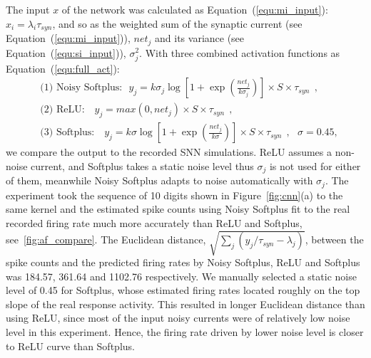 \documentclass[runningheads,a4paper]{llncs}
\begin{document}
The input $x$ of the network was calculated as Equation~(\ref{equ:mi_input}): $x_i=\lambda_i\tau_{syn}$, and so as the weighted sum of the synaptic current (see Equation~(\ref{equ:mi_input})), $net_j$ and its variance (see Equation~(\ref{equ:si_input})), $\sigma^2_j$.
With three combined activation functions as Equation~(\ref{equ:full_act}):
\begin{equation}
\begin{aligned}
&\textrm{(1) Noisy Softplus:~~}  y_j=k \sigma_j \log [1 + \exp(\frac{net_j}{k \sigma_j})] \times S \times \tau_{syn}~~,  \\
&\textrm{(2) ReLU:~~ } y_j=max(0, net_j) \times S \times \tau_{syn}~~, \\
&\textrm{(3) Softplus:~~ } y_j=k \sigma \log [1 + \exp(\frac{net_j}{k \sigma})] \times S \times \tau_{syn}~~, ~~~\sigma=0.45,  
\end{aligned}
\end{equation}	
we compare the output to the recorded SNN simulations.
ReLU assumes a non-noise current, and Softplus takes a static noise level thus $\sigma_j$ is not used for either of them, meanwhile Noisy Softplus adapts to noise automatically with $\sigma_j$.
The experiment took the sequence of 10 digits shown in Figure~\ref{fig:cnn}(a) to the same kernel and the estimated spike counts using Noisy Softplus fit to the real recorded firing rate much more accurately than ReLU and Softplus,  see~\ref{fig:af_compare}.
The Euclidean distance, $\sqrt{\sum_{j}(y_j/\tau_{syn} - \lambda_j)}$, between the spike counts and the predicted firing rates by Noisy Softplus, ReLU and Softplus was 184.57, 361.64 and 1102.76 respectively.
We manually selected a static noise level of 0.45 for Softplus, whose estimated firing rates located roughly on the top slope of the real response activity.
This resulted in longer Euclidean distance than using ReLU, since most of the input noisy currents were of relatively low noise level in this experiment.
Hence, the firing rate driven by lower noise level is closer to ReLU curve than Softplus.
\end{document}
